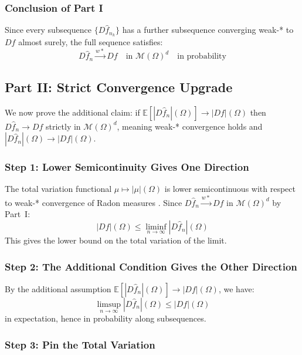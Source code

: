 \documentclass[12pt]{article}
\newcommand{\E}{\mathbb{E}}
\newcommand{\cM}{\mathcal{M}(\Omega)^d}
\newcommand{\fn}{\hat{f}_n}
\begin{document}
	\subsubsection*{Conclusion of Part I}
	
	Since every subsequence $\{D\hat{f}_{n_k}\}$ has a further subsequence
	converging weak-* to $Df$ almost surely, the full sequence satisfies:
	\begin{equation}
		D\fn \xrightarrow{w*} Df \quad \text{in } \cM
		\quad \text{in probability}
	\end{equation}
	
	\subsection{Part II: Strict Convergence Upgrade}
	
	We now prove the additional claim: if $\E[|D\fn|(\Omega)] \to |Df|(\Omega)$
	then $D\fn \to Df$ strictly in $\cM$, meaning weak-* convergence holds and
	$|D\fn|(\Omega) \to |Df|(\Omega)$.
	
	\subsubsection*{Step 1: Lower Semicontinuity Gives One Direction}
	
	The total variation functional $\mu \mapsto |\mu|(\Omega)$ is lower
	semicontinuous with respect to weak-* convergence of Radon measures
	\citep[Theorem~5.2]{evans2015measure}. Since $D\fn \xrightarrow{w*} Df$
	in $\cM$ by Part~I:
	\begin{equation}
		|Df|(\Omega) \leq \liminf_{n \to \infty} |D\fn|(\Omega)
	\end{equation}
	This gives the lower bound on the total variation of the limit.
	
	\subsubsection*{Step 2: The Additional Condition Gives the Other Direction}
	
	By the additional assumption $\E[|D\fn|(\Omega)] \to |Df|(\Omega)$, we have:
	\begin{equation}
		\limsup_{n \to \infty} |D\fn|(\Omega) \leq |Df|(\Omega)
	\end{equation}
	in expectation, hence in probability along subsequences.
	
	\subsubsection*{Step 3: Pin the Total Variation}
	
\end{document}

